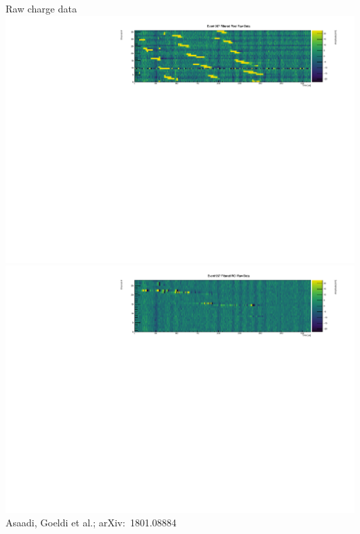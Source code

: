 \documentclass[]{beamer}
\begin{document}
\begin{frame}{Raw charge data}
	\centering
	\includegraphics[width=\textwidth]{defence/event967_rawFilteredPixel}\\
	\includegraphics[width=\textwidth]{defence/event967_rawFilteredROI}\\
	{\tiny Asaadi, Goeldi et al.; arXiv:~1801.08884~\cite{pixel_paper}}
\end{frame}
\end{document}
